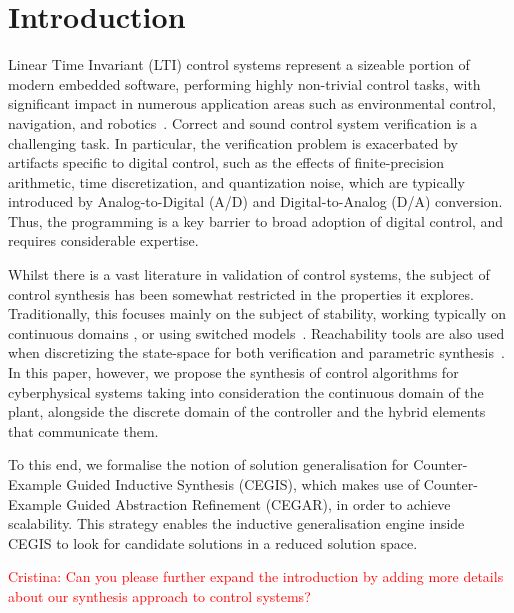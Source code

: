 \documentclass[runningheads,a4paper]{llncs}
\begin{document}
\section{Introduction}

Linear Time Invariant (LTI) control systems represent a sizeable portion of
modern embedded software, performing highly non-trivial control tasks,
with significant impact in numerous application areas such as
environmental control, navigation, and 
robotics~\cite{astrom1997computer,Franklin15}.
Correct and sound control system verification is a challenging task. 
In particular, the verification problem is exacerbated by artifacts specific 
to digital control, such as the effects of finite-precision arithmetic, 
time discretization, and quantization noise, which are typically introduced 
by Analog-to-Digital (A/D) and Digital-to-Analog (D/A) conversion.  
Thus, the programming is a key barrier to broad adoption of digital control, 
and requires considerable expertise.

Whilst there is a vast literature in validation of control systems,
the subject of control synthesis has been somewhat restricted in the
properties it explores.  Traditionally, this focuses mainly on the
subject of stability, working typically on continuous domains
\cite{sadabadi2016static}, or using switched
models~\cite{DBLP:conf/emsoft/RavanbakhshS16}.  Reachability tools are
also used when discretizing the state-space for both verification and
parametric synthesis~\cite{cimatti2013parameter}.
In this paper, however, we propose the synthesis of control algorithms for
cyberphysical systems taking into consideration the continuous domain
of the plant, alongside the discrete domain of the controller and the
hybrid elements that communicate them.

To this end, we formalise the notion of solution generalisation for
Counter-Example Guided Inductive Synthesis (CEGIS), which makes use 
of Counter-Example Guided Abstraction Refinement (CEGAR),
in order to achieve scalability.
This strategy enables the inductive generalisation engine inside CEGIS
to look for candidate solutions in a reduced solution space.  %

\textcolor{red}{Cristina: Can you please further expand the introduction
by adding more details about our synthesis approach to control systems?}
\end{document}
